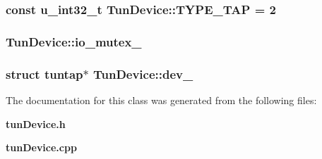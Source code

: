 \subsubsection{\setlength{\rightskip}{0pt plus 5cm}const {\bf u\_\-int32\_\-t} {\bf Tun\-Device::TYPE\_\-TAP} = 2\hspace{0.3cm}{\tt  [static]}}\label{classTunDevice_b4ce6b158bbe4fe051b6fea8cd3d6cd3}


\subsubsection{ {\bf Tun\-Device::io\_\-mutex\_\-}\hspace{0.3cm}{\tt  [private]}}\label{classTunDevice_e130228e28996e644d2013089e704d4c}


\subsubsection{\setlength{\rightskip}{0pt plus 5cm}struct tuntap$\ast$ {\bf Tun\-Device::dev\_\-}\hspace{0.3cm}{\tt  [private]}}\label{classTunDevice_239c85381dfcf1776303778d1784df51}




The documentation for this class was generated from the following files:\begin{CompactItemize}
\item 
{\bf tun\-Device.h}\item 
{\bf tun\-Device.cpp}\end{CompactItemize}
